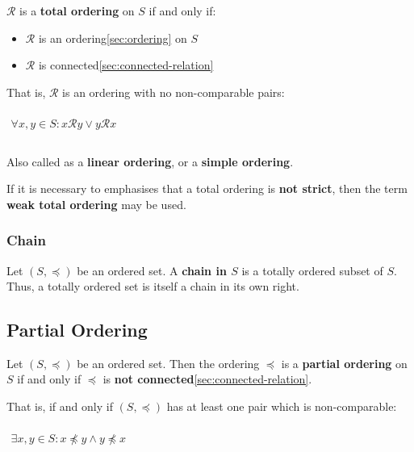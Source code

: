 $\mathcal{R}$ is a \textbf{total ordering} on $S$ if and only if:

\begin{itemize}
\item $\mathcal{R}$ is an ordering\ref{sec:ordering} on $S$
\item $\mathcal{R}$ is connected\ref{sec:connected-relation}
\end{itemize}

That is, $\mathcal{R}$ is an ordering with no non-comparable pairs:


\begin{math}
  \begin{array}{c}
    \\
    \forall x, y \in S: x \mathcal{R} y \lor y \mathcal{R} x\\
    \\
  \end{array}
\end{math}

Also called as a \textbf{linear ordering}, or a \textbf{simple
  ordering}.

If it is necessary to emphasises that a total ordering is \textbf{not
  strict}, then the term \textbf{weak total ordering} may be used.

\subsubsection{Chain}
\label{sec:chain}

Let $(S, \preceq)$ be an ordered set. A \textbf{chain in $S$} is a
totally ordered subset of $S$. Thus, a totally ordered set is itself a
chain in its own right.


\subsection{Partial Ordering}
\label{sec:partial-ordering}

Let $(S, \preceq)$ be an ordered set. Then the ordering $\preceq$ is a
\textbf{partial ordering} on $S$ if and only if $\preceq$ is
\textbf{not connected}\ref{sec:connected-relation}.

That is, if and only if $(S, \preceq)$ has at least one pair which is
non-comparable:

\begin{math}
  \begin{array}{c}
    \\
    \exists x, y \in S : x \npreceq y \land y \npreceq x \\
    \\
  \end{array}
\end{math}


